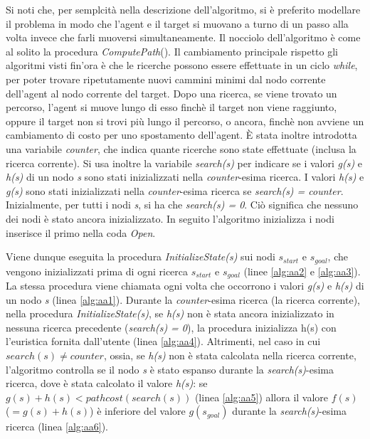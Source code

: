 \documentclass[11pt]{article}
\begin{document}
\par{Si noti che, per semplcit\`a nella descrizione dell'algoritmo, si \`e preferito modellare il problema in modo che l'agent e il target si muovano a turno di un passo alla volta invece che farli muoversi simultaneamente. Il nocciolo dell'algoritmo \`e come al solito la procedura \emph{ComputePath}(). Il cambiamento principale rispetto gli algoritmi visti fin'ora \`e che le ricerche possono essere effettuate in un ciclo \emph{while}, per poter trovare ripetutamente nuovi cammini minimi dal nodo corrente dell'agent al nodo corrente del target. Dopo una ricerca, se viene trovato un percorso, l'agent si muove lungo di esso finch\`e il target non viene raggiunto, oppure il target non si trovi pi\`u lungo il percorso, o ancora, finch\`e non avviene un cambiamento di costo per uno spostamento dell'agent. \`E stata inoltre introdotta una variabile \emph{counter}, che indica quante ricerche sono state effettuate (inclusa la ricerca corrente). Si usa inoltre la variabile \emph{search(s)} per indicare se i valori \emph{g(s)} e \emph{h(s)} di un nodo \emph{s}  sono stati inizializzati nella \emph{counter}-esima ricerca. I valori \emph{h(s)} e \emph{g(s)} sono stati inizializzati nella \emph{counter}-esima ricerca se \emph{search(s) = counter}. Inizialmente, per tutti i nodi \emph{s}, si ha che \emph{search(s) = 0}. Ci\`o significa che nessuno dei nodi \`e stato ancora inizializzato. In seguito l'algoritmo inizializza i nodi inserisce il primo nella coda \emph{Open}.}
\par{Viene dunque eseguita la procedura \emph{InitializeState(s)} sui nodi $s_{start}$ e $s_{goal}$, che vengono inizializzati prima di ogni ricerca $s_{start}$ e $s_{goal}$ (linee \ref{alg:aa2} e \ref{alg:aa3}). La stessa procedura viene chiamata ogni volta che occorrono i valori \emph{g(s)} e \emph{h(s)} di un nodo \emph{s} (linea \ref{alg:aa1}). Durante la \emph{counter}-esima ricerca (la ricerca corrente), nella procedura \emph{InitializeState(s)}, se \emph{h(s)} non \`e stata ancora inizializzato in nessuna ricerca precedente (\emph{search(s) = 0}), la procedura inizializza h(s) con l'euristica fornita dall'utente (linea \ref{alg:aa4}). Altrimenti, nel caso in cui $search(s) \neq counter$, ossia, se \emph{h(s)} non \`e stata calcolata nella ricerca corrente, l'algoritmo controlla se il nodo \emph{s} \`e stato espanso durante la \emph{search(s)}-esima ricerca, dove \`e stata calcolato il valore \emph{h(s)}: se $g(s) + h(s) < pathcost(search(s))$ (linea \ref{alg:aa5}) allora il valore $f(s)$ ($= g(s) + h(s)$) \`e inferiore del valore $g(s_{goal})$ durante la \emph{search(s)}-esima ricerca (linea \ref{alg:aa6}).}
\end{document}
